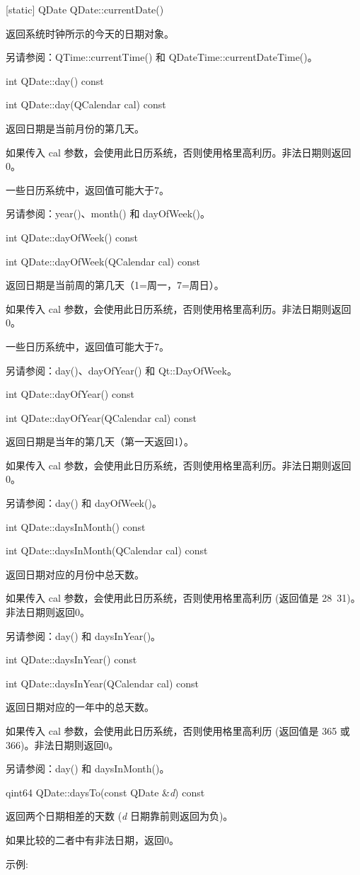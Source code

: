 [static] QDate QDate::currentDate()

返回系统时钟所示的今天的日期对象。

另请参阅：QTime::currentTime() 和 QDateTime::currentDateTime()。

\splitLine

int QDate::day() const

int QDate::day(QCalendar cal) const

返回日期是当前月份的第几天。

如果传入 cal 参数，会使用此日历系统，否则使用格里高利历。非法日期则返回0。

一些日历系统中，返回值可能大于7。

另请参阅：year()、month() 和 dayOfWeek()。

\splitLine

int QDate::dayOfWeek() const

int QDate::dayOfWeek(QCalendar cal) const

返回日期是当前周的第几天（1=周一，7=周日）。

如果传入 cal 参数，会使用此日历系统，否则使用格里高利历。非法日期则返回0。

一些日历系统中，返回值可能大于7。

另请参阅：day()、dayOfYear() 和 Qt::DayOfWeek。

\splitLine

int QDate::dayOfYear() const

int QDate::dayOfYear(QCalendar cal) const

返回日期是当年的第几天（第一天返回1）。

如果传入 cal 参数，会使用此日历系统，否则使用格里高利历。非法日期则返回0。

另请参阅：day() 和 dayOfWeek()。

\splitLine

int QDate::daysInMonth() const

int QDate::daysInMonth(QCalendar cal) const

返回日期对应的月份中总天数。

如果传入 cal 参数，会使用此日历系统，否则使用格里高利历 (返回值是 28~31)。非法日期则返回0。

另请参阅：day() 和 daysInYear()。

\splitLine

int QDate::daysInYear() const

int QDate::daysInYear(QCalendar cal) const

返回日期对应的一年中的总天数。

如果传入 cal 参数，会使用此日历系统，否则使用格里高利历 (返回值是 365 或 366)。非法日期则返回0。

另请参阅：day() 和 daysInMonth()。

\splitLine

qint64 QDate::daysTo(const QDate \&\emph{d}) const

返回两个日期相差的天数 (\emph{d} 日期靠前则返回为负)。

如果比较的二者中有非法日期，返回0。

示例:

